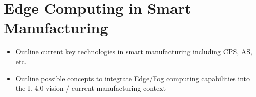 \section{Edge Computing in Smart Manufacturing}\label{sec:main}

\begin{itemize}
\item Outline current key technologies in smart manufacturing including CPS, AS, etc.
\item Outline possible concepts to integrate Edge/Fog computing capabilities into the I. 4.0 vision / current manufacturing context 
\end{itemize}
